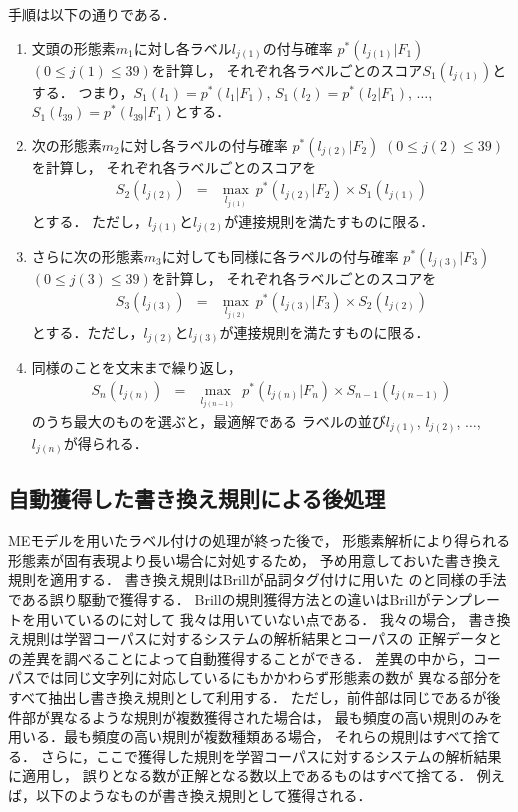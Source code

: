 手順は以下の通りである．
\begin{enumerate}
\item 文頭の形態素$m_1$に対し各ラベル$l_{j(1)}$の付与確率
  $p^{*}(l_{j(1)}|F_{1})$ $(0\leq j(1)\leq 39)$を計算し，
  それぞれ各ラベルごとのスコア$S_{1}(l_{j(1)})$とする．
  つまり，$S_{1}(l_{1}) = p^{*}(l_{1}|F_{1})$, 
  $S_{1}(l_{2}) = p^{*}(l_{2}|F_{1})$, 
  $\ldots$, $S_{1}(l_{39}) = p^{*}(l_{39}|F_{1})$とする．
\item 次の形態素$m_2$に対し各ラベルの付与確率
  $p^{*}(l_{j(2)}|F_{2})$ $(0\leq j(2)\leq 39)$を計算し，
  それぞれ各ラベルごとのスコアを
  \begin{eqnarray*}
    S_{2}(l_{j(2)}) 
    & = & \mathop{max}_{l_{j(1)}}\ 
    p^{*}(l_{j(2)}|F_{2}) \times S_{1}(l_{j(1)}) 
  \end{eqnarray*}
  とする．
  ただし，$l_{j(1)}$と$l_{j(2)}$が連接規則を満たすものに限る．
\item さらに次の形態素$m_3$に対しても同様に各ラベルの付与確率
  $p^{*}(l_{j(3)}|F_{3})$ $(0\leq j(3)\leq 39)$を計算し，
  それぞれ各ラベルごとのスコアを
  \begin{eqnarray*}
    S_{3}(l_{j(3)}) 
    & = & \mathop{max}_{l_{j(2)}}\ 
    p^{*}(l_{j(3)}|F_{3}) \times S_{2}(l_{j(2)}) 
  \end{eqnarray*}
  とする．ただし，$l_{j(2)}$と$l_{j(3)}$が連接規則を満たすものに限る．
\item 同様のことを文末まで繰り返し，
  \begin{eqnarray*}
    S_{n}(l_{j(n)}) 
    & = & \mathop{max}_{l_{j(n-1)}}\
    p^{*}(l_{j(n)}|F_{n}) \times S_{n-1}(l_{j(n-1)}) 
  \end{eqnarray*}
  のうち最大のものを選ぶと，最適解である
  ラベルの並び$l_{j(1)}$, $l_{j(2)}$, $\ldots$, $l_{j(n)}$が得られる．
\end{enumerate}

\subsection{自動獲得した書き換え規則による後処理}
\label{sec:post_processing}

MEモデルを用いたラベル付けの処理が終った後で，
形態素解析により得られる形態素が固有表現より長い場合に対処するため，
予め用意しておいた書き換え規則を適用する．
書き換え規則はBrillが品詞タグ付けに用いた\cite{Brill:95}
のと同様の手法である誤り駆動で獲得する．
Brillの規則獲得方法との違いはBrillがテンプレートを用いているのに対して
我々は用いていない点である．
我々の場合，
書き換え規則は学習コーパスに対するシステムの解析結果とコーパスの
正解データとの差異を調べることによって自動獲得することができる．
差異の中から，コーパスでは同じ文字列に対応しているにもかかわらず形態素の数が
異なる部分をすべて抽出し書き換え規則として利用する．
ただし，前件部は同じであるが後件部が異なるような規則が複数獲得された場合は，
最も頻度の高い規則のみを用いる．最も頻度の高い規則が複数種類ある場合，
それらの規則はすべて捨てる．
さらに，ここで獲得した規則を学習コーパスに対するシステムの解析結果に適用し，
誤りとなる数が正解となる数以上であるものはすべて捨てる．
例えば，以下のようなものが書き換え規則として獲得される．

